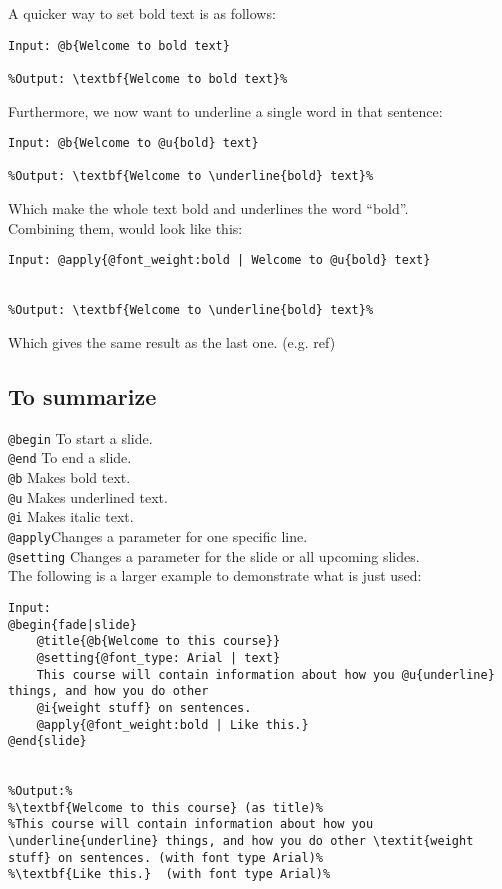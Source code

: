 A quicker way to set bold text is as follows: \\

\begin{lstlisting}[frame=single]
Input: @b{Welcome to bold text}

%Output: \textbf{Welcome to bold text}%
\end{lstlisting}
Furthermore, we now want to underline a single word in that sentence: \\

\begin{lstlisting}[frame=single]
Input: @b{Welcome to @u{bold} text}

%Output: \textbf{Welcome to \underline{bold} text}%
\end{lstlisting}
Which make the whole text bold and underlines the word ``bold''.\\
Combining them, would look like this:\\

\begin{lstlisting}[frame=single]
Input: @apply{@font_weight:bold | Welcome to @u{bold} text}


%Output: \textbf{Welcome to \underline{bold} text}%
\end{lstlisting}
Which gives the same result as the last one. (e.g. ref)

\subsection*{To summarize}
\texttt{@begin} To start a slide. \\
\texttt{@end} To end a slide. \\
\texttt{@b} Makes bold text. \\
\texttt{@u} Makes underlined text. \\
\texttt{@i} Makes italic text. \\
\texttt{@apply}Changes a parameter for one specific line. \\
\texttt{@setting} Changes a parameter for the slide or all upcoming slides.\\

The following is a larger example to demonstrate what is just used: \\

\begin{lstlisting}[frame=single]
Input:
@begin{fade|slide}
    @title{@b{Welcome to this course}}
    @setting{@font_type: Arial | text}
    This course will contain information about how you @u{underline} things, and how you do other    
    @i{weight stuff} on sentences.
    @apply{@font_weight:bold | Like this.}
@end{slide}


%Output:%
%\textbf{Welcome to this course} (as title)%
%This course will contain information about how you \underline{underline} things, and how you do other \textit{weight stuff} on sentences. (with font type Arial)%
%\textbf{Like this.}  (with font type Arial)%
\end{lstlisting}


